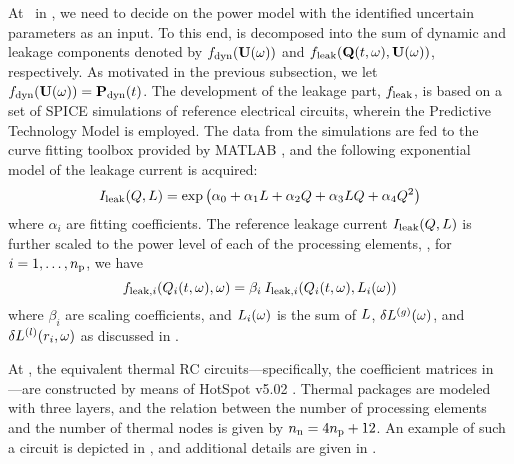 At \ in , we need to decide on the power model with the identified uncertain parameters as an input. To this end,  is decomposed into the sum of dynamic and leakage components denoted by $f_{\text{dyn}}(\mathbf{U}(\omega))$ and $f_{\text{leak}}(\mathbf{Q}(t, \omega), \mathbf{U}(\omega))$, respectively. As motivated in the previous subsection, we let $f_{\text{dyn}}(\mathbf{U}(\omega)) = \mathbf{P}_{\text{dyn}}(t)$. The development of the leakage part, $f_{\text{leak}}$, is based on a set of SPICE simulations of reference electrical circuits, wherein the Predictive Technology Model \cite{ptm} is employed. The data from the simulations are fed to the curve fitting toolbox provided by MATLAB \cite{matlab}, and the following exponential model of the leakage current is acquired:
\begin{equation} \elabel{leakage-current}
  I_\leak(\T, \Leff) = \exp \left( \alpha_0 + \alpha_1 \Leff + \alpha_2 \T + \alpha_3 \Leff \T + \alpha_4 \T^2 \right)
\end{equation}
where $\alpha_i$ are fitting coefficients. The reference leakage current $I_{\text{leak}}(Q, L)$ is further scaled to the power level of each of the processing elements, \ie, for $i = 1, \dotsc, {n_\text{p}}$, we have
\[
  f_{\text{leak}, i}(Q_i(t, \omega), \omega) = \beta_i \: I_{\text{leak}, i}(Q_i(t, \omega), L_i(\omega))
\]
where $\beta_i$ are scaling coefficients, and $L_i(\omega)$ is the sum of $L$, ${\delta L^{(g)}}(\omega)$, and $\delta L^{(l)}(r_i, \omega)$ as discussed in .

At , the equivalent thermal RC circuits---specifically, the coefficient matrices in ---are constructed by means of HotSpot v5.02 \cite{hotspot}. Thermal packages are modeled with three layers, and the relation between the number of processing elements and the number of thermal nodes is given by ${n_\text{n}} = 4 {n_\text{p}} + 12$. An example of such a circuit is depicted in , and additional details are given in .
